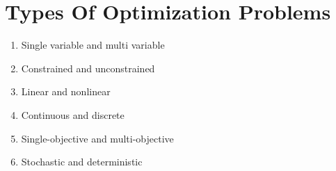 \documentclass[11pt]{report}
\begin{document}
\section{Types Of Optimization Problems}
\label{sec:org2b3b031}
\begin{enumerate}
\item Single variable and multi variable
\item Constrained and unconstrained
\item Linear and nonlinear
\item Continuous and discrete
\item Single-objective and multi-objective
\item Stochastic and deterministic
\end{enumerate}
\end{document}
